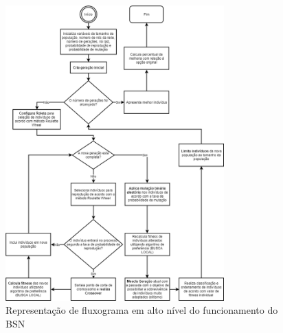 \begin{figure} [t]%
	\centering
	\includegraphics[width=0.75\textwidth]{./figuras/BSN-Flow3.png}
	\caption[Fluxograma do BSN]{Representação de fluxograma em alto nível do funcionamento do BSN}
	\label{fig_bsn_flow}
\end{figure}

